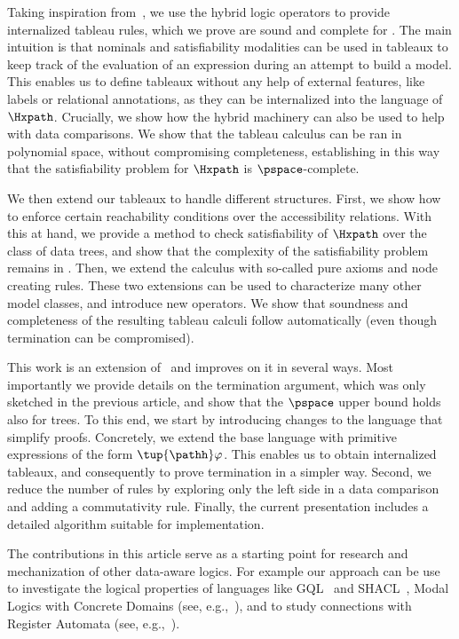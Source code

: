 \documentclass[10pt,a4paper]{amsart}
\theoremstyle{definition}
\theoremstyle{remark}
\begin{document}
Taking inspiration from~\cite{BolanderB07}, we use the hybrid logic operators to provide internalized tableau rules, which we prove are sound and complete for \Hxpath.  The main intuition is
that nominals and satisfiability modalities can be used in tableaux to
keep track of the evaluation of an expression during an attempt to build a
model. This enables us to define tableaux without any help of external features, like labels or relational annotations, as they can be internalized into the language of $\Hxpath$. Crucially, we show how the hybrid machinery can also be used to help with data comparisons. 
We show that the tableau calculus can be ran in polynomial space,
without compromising completeness, establishing in this way that the satisfiability problem
for $\Hxpath$ is $\pspace$-complete.

We then extend our tableaux to handle different structures. First, we show how to enforce certain reachability conditions over the accessibility relations. With this at hand, we provide a method to check satisfiability of $\Hxpath$ over the class of data trees, and show that the complexity of the satisfiability problem remains in \pspace. 
Then, we extend the calculus with so-called pure axioms and node creating rules. These two extensions can be used to characterize many other model classes, and introduce new operators. We show that soundness and  completeness of the resulting tableau calculi follow automatically (even though termination can be compromised). 

This work is an extension of~\cite{ArecesFS17} and improves on it in several ways.  Most importantly we provide details on the termination argument, which was only sketched in the previous article, and show that the $\pspace$ upper bound holds also for trees. To this end, we start by introducing changes to the language that simplify proofs. Concretely, we extend the base language with primitive expressions of the form $\tup{\pathh}\varphi$. This enables us to obtain internalized tableaux, and consequently to prove termination  in a simpler way. Second, we reduce the number of rules by exploring only the left side in a data comparison and adding a commutativity rule. Finally, the current presentation includes a detailed algorithm suitable for implementation.

The contributions in this article serve as a starting point for research and mechanization of other data-aware logics. For example our approach can be use to investigate the logical properties of languages like GQL~\cite{FrancisGGLMMMPR23,FrancisGGLMMMPR23b} and SHACL~\cite{Ortiz23,Ahmetaj0S23}, Modal Logics with Concrete Domains (see, e.g.,~\cite{DemriQ21}), and to study connections with Register Automata (see, e.g.,~\cite{KaminskiF94}).
\end{document}

